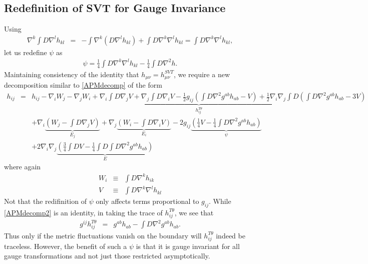 \documentclass[10pt,letterpaper]{article}
\numberwithin{equation}{section}
\begin{document}
\begin{appendices}
\section{Redefinition of SVT for Gauge Invariance}
Using
\begin{eqnarray}
\nabla^k\int D \nabla^l h_{kl} &=& -\int \nabla^k(D\nabla^l h_{kl}) + \int D \nabla^k\nabla^l h_{kl}
= \int D\nabla^k\nabla^lh_{kl},
\end{eqnarray}
let us redefine $\psi$ as
\begin{eqnarray}
\psi = \tfrac14 \int D \nabla^k\nabla^l h_{kl} -\tfrac14\int D \nabla^2 h.
\end{eqnarray}
Maintaining consistency of the identity that $h_{\mu\nu} = h^{SVT}_{\mu\nu}$, we require a new decomposition similar to \eqref{APMdecomp} of the form
\begin{eqnarray}
h_{ij} &=& \underbrace{ h_{ij} - \nabla_i W_j - \nabla_j W_i + \nabla_i \int D\nabla_j  V + \nabla_j\int D\nabla_i V-\tfrac12 g_{ij}\left(\int D \nabla^2 g^{ab}h_{ab}-V\right) + \tfrac12 \nabla_i\nabla_j \int D \left(\int D \nabla^2 g^{ab}h_{ab}-3V\right)}_{h_{ij}^{T\theta}}
\nonumber\\
&&+\nabla_i \underbrace{\left( W_j - \int D\nabla_j V\right)}_{E_j} + \nabla_j \underbrace{\left(W_i -\int D\nabla_i V\right)}_{E_i}-2g_{ij}\underbrace{ \left( \tfrac14 V-\tfrac14 \int D\nabla^2 g^{ab}h_{ab}\right)}_{\psi}
\nonumber\\
&&+2\nabla_i\nabla_j \underbrace{\left( \tfrac34 \int D V - \tfrac14 \int D \int D\nabla^2 g^{ab}h_{ab}\right)}_{E}
\label{APMdecomp2}
\end{eqnarray}
where again
\begin{eqnarray}
W_i &\equiv& \int D \nabla^k h_{ik}
\nonumber\\
V &\equiv& \int D \nabla^k \nabla^l h_{kl}
\end{eqnarray}
Not that the redifinition of $\psi$ only affects terms proportional to $g_{ij}$. While \eqref{APMdecomp2} is an identity, in taking the trace of $h_{ij}^{T\theta}$, we see that
\begin{eqnarray}
g^{ij}h^{T\theta}_{ij} &=& g^{ab}h_{ab} - \int D \nabla^2 g^{ab}h_{ab}.
\end{eqnarray}
Thus only if the metric fluctuations vanish on the boundary will $h_{ij}^{T\theta}$ indeed be traceless. However, the benefit of such a $\psi$ is that it is gauge invariant for all gauge transformations and not just those restricted asymptotically.
\\ \\

\end{appendices}
\end{document}
